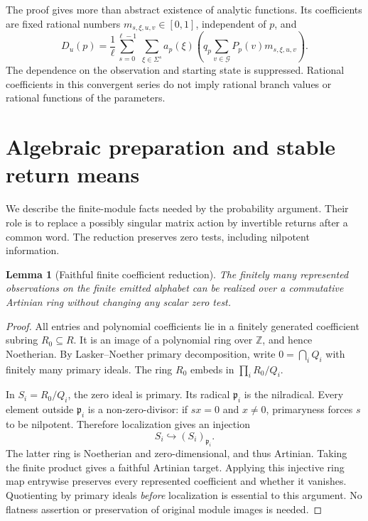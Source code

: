 \documentclass[11pt]{article}
\newtheorem{lemma}[theorem]{Lemma}
\theoremstyle{definition}
\theoremstyle{remark}
\newcommand{\Gap}{\mathcal G}
\begin{document}
The proof gives more than abstract existence of analytic functions. Its coefficients are fixed rational numbers $m_{s,\xi,u,v}\in[0,1]$, independent of $p$, and
\begin{equation}\label{eq:fullbranch}
 D_u(p)=\frac1\ell\sum_{s=0}^{\ell-1}\ \sum_{\xi\in\Sigma^s}
 a_p(\xi)\left(q_p\sum_{v\in\Gap}P_p(v)m_{s,\xi,u,v}\right).
\end{equation}
The dependence on the observation and starting state is suppressed. Rational coefficients in this convergent series do not imply rational branch values or rational functions of the parameters.

\section{Algebraic preparation and stable return means}\label{sec:algebra}
We describe the finite-module facts needed by the probability argument. Their role is to replace a possibly singular matrix action by invertible returns after a common word. The reduction preserves zero tests, including nilpotent information.

\begin{lemma}[Faithful finite coefficient reduction]\label{lem:ring}
The finitely many represented observations on the finite emitted alphabet can be realized over a commutative Artinian ring without changing any scalar zero test.
\end{lemma}
\begin{proof}
All entries and polynomial coefficients lie in a finitely generated coefficient subring $R_0\subseteq R$. It is an image of a polynomial ring over $\mathbb Z$, and hence Noetherian. By Lasker--Noether primary decomposition, write $0=\bigcap_i Q_i$ with finitely many primary ideals. The ring $R_0$ embeds in $\prod_i R_0/Q_i$.

In $S_i=R_0/Q_i$, the zero ideal is primary. Its radical $\mathfrak p_i$ is the nilradical. Every element outside $\mathfrak p_i$ is a non-zero-divisor: if $sx=0$ and $x\ne0$, primaryness forces $s$ to be nilpotent. Therefore localization gives an injection
\[
 S_i\hookrightarrow (S_i)_{\mathfrak p_i}.
\]
The latter ring is Noetherian and zero-dimensional, and thus Artinian. Taking the finite product gives a faithful Artinian target. Applying this injective ring map entrywise preserves every represented coefficient and whether it vanishes. Quotienting by primary ideals \emph{before} localization is essential to this argument. No flatness assertion or preservation of original module images is needed.
\end{proof}
\end{document}

